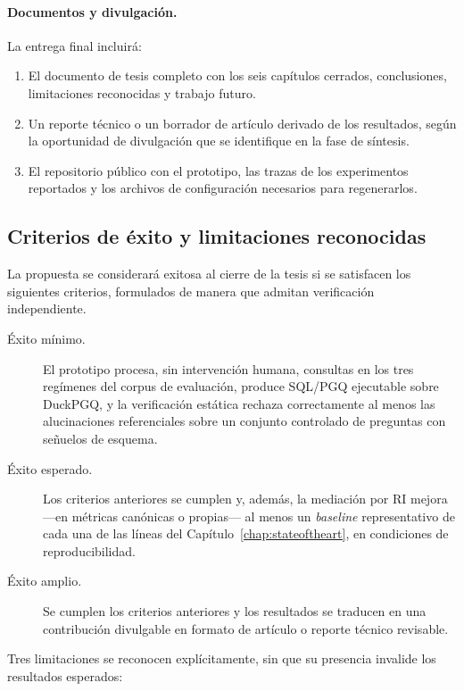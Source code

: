 \paragraph{Documentos y divulgación.} La entrega final incluirá:

\begin{enumerate}
    \item El documento de tesis completo con los seis capítulos cerrados, conclusiones, limitaciones reconocidas y trabajo futuro.
    \item Un reporte técnico o un borrador de artículo derivado de los resultados, según la oportunidad de divulgación que se identifique en la fase de síntesis.
    \item El repositorio público con el prototipo, las trazas de los experimentos reportados y los archivos de configuración necesarios para regenerarlos.
\end{enumerate}

\subsection{Criterios de éxito y limitaciones reconocidas}
\label{subsec:prop-criterios}

La propuesta se considerará exitosa al cierre de la tesis si se satisfacen los siguientes criterios, formulados de manera que admitan verificación independiente.

\begin{description}
    \item[Éxito mínimo.] El prototipo procesa, sin intervención humana, consultas en los tres regímenes del corpus de evaluación, produce \ac{SQL}/\ac{PGQ} ejecutable sobre DuckPGQ, y la verificación estática rechaza correctamente al menos las alucinaciones referenciales sobre un conjunto controlado de preguntas con señuelos de esquema.
    \item[Éxito esperado.] Los criterios anteriores se cumplen y, además, la mediación por \ac{RI} mejora ---en métricas canónicas o propias--- al menos un \emph{baseline} representativo de cada una de las líneas del Capítulo~\ref{chap:stateoftheart}, en condiciones de reproducibilidad.
    \item[Éxito amplio.] Se cumplen los criterios anteriores y los resultados se traducen en una contribución divulgable en formato de artículo o reporte técnico revisable.
\end{description}

Tres limitaciones se reconocen explícitamente, sin que su presencia invalide los resultados esperados:

